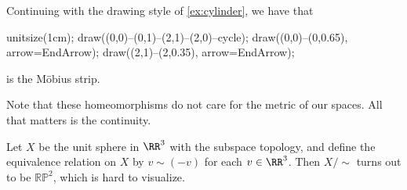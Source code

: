\documentclass[../notes.tex]{subfiles}
\begin{document}
\begin{example}
	Continuing with the drawing style of \autoref{ex:cylinder}, we have that
	\begin{center}
		\begin{asy}
			unitsize(1cm);
			draw((0,0)--(0,1)--(2,1)--(2,0)--cycle);
			draw((0,0)--(0,0.65), arrow=EndArrow);
			draw((2,1)--(2,0.35), arrow=EndArrow);
		\end{asy}
	\end{center}
	is the M\"obius strip.
\end{example}
\begin{remark}
	Note that these homeomorphisms do not care for the metric of our spaces. All that matters is the continuity.
\end{remark}
\begin{example}
	Let $X$ be the unit sphere in $\RR^3$ with the subspace topology, and define the equivalence relation on $X$ by $v\sim(-v)$ for each $v\in\RR^3$. Then $X/{\sim}$ turns out to be $\mathbb{RP}^2$, which is hard to visualize.
\end{example}
\end{document}
